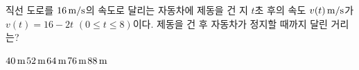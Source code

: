 직선 도로를 $16\mkern3mu \mathrm{m/s}$의 속도로 달리는 자동차에 제동을 건 지 $t$초 후의 속도 $v(t)\mkern3mu \mathrm{m/s}$가 $v(t)=16-2t$ $(0\le t\le 8)$이다. 제동을 건 후 자동차가 정지할 때까지 달린 거리는?
\begin{choices32}{$40\mkern3mu \mathrm{m}$}{$52\mkern3mu \mathrm{m}$}{$64\mkern3mu \mathrm{m}$}{$76\mkern3mu \mathrm{m}$}{$88\mkern3mu \mathrm{m}$}\end{choices32}
